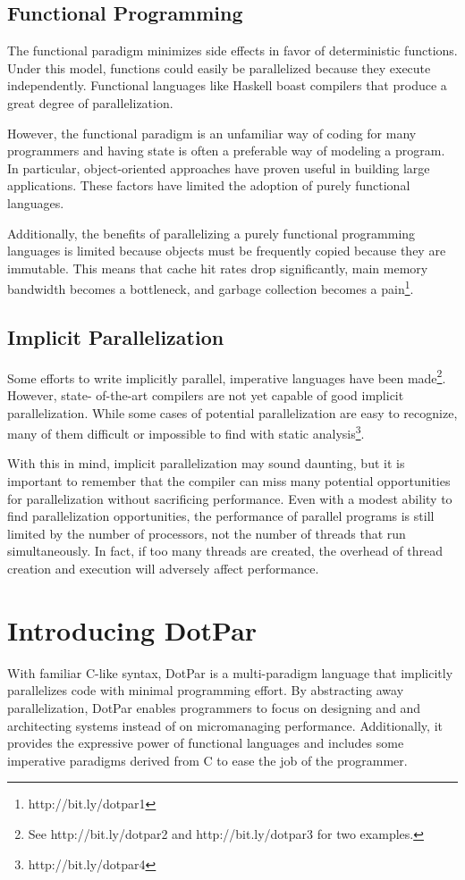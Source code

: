 \documentclass{article}
\begin{document}
\subsection{Functional Programming}
The functional paradigm minimizes side effects in favor of
deterministic functions. Under this model, functions could easily be
parallelized because they execute independently. Functional languages
like Haskell boast compilers that produce a great degree of
parallelization.

However, the functional paradigm is an unfamiliar way of coding for
many programmers and having state is often a preferable way of
modeling a program. In particular, object-oriented approaches have
proven useful in building large applications. These factors have
limited the adoption of purely functional languages.

Additionally, the benefits of parallelizing a purely functional
programming languages is limited because objects must be frequently
copied because they are immutable. This means that cache hit rates
drop significantly, main memory bandwidth becomes a bottleneck, and
garbage collection becomes a pain\footnote{http://bit.ly/dotpar1}.

\subsection{Implicit Parallelization}
Some efforts to write implicitly parallel, imperative languages have
been made\footnote{See http://bit.ly/dotpar2 and http://bit.ly/dotpar3
  for two examples.}. However, state- of-the-art compilers are not yet
capable of good implicit parallelization. While some cases of
potential parallelization are easy to recognize, many of them
difficult or impossible to find with static
analysis\footnote{http://bit.ly/dotpar4}.

With this in mind, implicit parallelization may sound daunting, but it
is important to remember that the compiler can miss many potential
opportunities for parallelization without sacrificing
performance. Even with a modest ability to find parallelization
opportunities, the performance of parallel programs is still limited
by the number of processors, not the number of threads that run
simultaneously. In fact, if too many threads are created, the overhead
of thread creation and execution will adversely affect performance.

\section{Introducing DotPar}
With familiar C-like syntax, DotPar is a multi-paradigm language that
implicitly parallelizes code with minimal programming effort. By
abstracting away parallelization, DotPar enables programmers to focus
on designing and and architecting systems instead of on micromanaging
performance. Additionally, it provides the expressive power of
functional languages and includes some imperative paradigms derived
from C to ease the job of the programmer.
\end{document}
